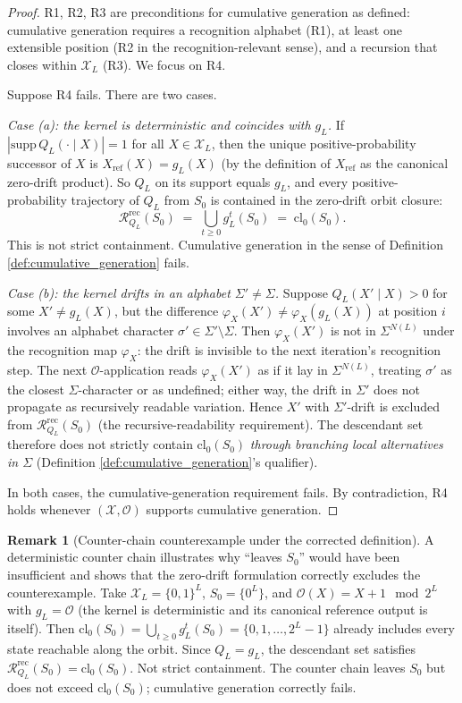 \documentclass[11pt]{article}
\theoremstyle{plain}
\theoremstyle{definition}
\newtheorem{remark}[theorem]{Remark}
\newcommand{\descX}{\varphi_X}
\newcommand{\Xset}{\mathcal{X}}
\newcommand{\Op}{\mathcal{O}}
\newcommand{\Reach}{\mathcal{R}}
\begin{document}
\begin{proof}
R1, R2, R3 are preconditions for cumulative generation as defined: cumulative generation requires a recognition alphabet (R1), at least one extensible position (R2 in the recognition-relevant sense), and a recursion that closes within $\Xset_L$ (R3). We focus on R4.

Suppose R4 fails. There are two cases.

\emph{Case (a): the kernel is deterministic and coincides with $g_L$.} If $|\mathrm{supp}\, Q_L(\cdot \mid X)| = 1$ for all $X \in \Xset_L$, then the unique positive-probability successor of $X$ is $X_{\mathrm{ref}}(X) = g_L(X)$ (by the definition of $X_{\mathrm{ref}}$ as the canonical zero-drift product). So $Q_L$ on its support equals $g_L$, and every positive-probability trajectory of $Q_L$ from $S_0$ is contained in the zero-drift orbit closure:
\[
\Reach_{Q_L}^{\mathrm{rec}}(S_0) \;=\; \bigcup_{t \ge 0} g_L^t(S_0) \;=\; \mathrm{cl}_0(S_0).
\]
This is not strict containment. Cumulative generation in the sense of Definition \ref{def:cumulative_generation} fails.

\emph{Case (b): the kernel drifts in an alphabet $\Sigma' \ne \Sigma$.} Suppose $Q_L(X' \mid X) > 0$ for some $X' \ne g_L(X)$, but the difference $\descX(X') \ne \descX(g_L(X))$ at position $i$ involves an alphabet character $\sigma' \in \Sigma' \setminus \Sigma$. Then $\descX(X')$ is not in $\Sigma^{N(L)}$ under the recognition map $\descX$: the drift is invisible to the next iteration's recognition step. The next $\Op$-application reads $\descX(X')$ as if it lay in $\Sigma^{N(L)}$, treating $\sigma'$ as the closest $\Sigma$-character or as undefined; either way, the drift in $\Sigma'$ does not propagate as recursively readable variation. Hence $X'$ with $\Sigma'$-drift is excluded from $\Reach_{Q_L}^{\mathrm{rec}}(S_0)$ (the recursive-readability requirement). The descendant set therefore does not strictly contain $\mathrm{cl}_0(S_0)$ \emph{through branching local alternatives in $\Sigma$} (Definition \ref{def:cumulative_generation}'s qualifier).

In both cases, the cumulative-generation requirement fails. By contradiction, R4 holds whenever $(\Xset, \Op)$ supports cumulative generation.
\end{proof}

\begin{remark}[Counter-chain counterexample under the corrected definition]
\label{rem:det_closure_essential}
A deterministic counter chain illustrates why ``leaves $S_0$'' would have been insufficient and shows that the zero-drift formulation correctly excludes the counterexample. Take $\Xset_L = \{0, 1\}^L$, $S_0 = \{0^L\}$, and $\Op(X) = X + 1 \mod 2^L$ with $g_L = \Op$ (the kernel is deterministic and its canonical reference output is itself). Then $\mathrm{cl}_0(S_0) = \bigcup_{t \ge 0} g_L^t(S_0) = \{0, 1, \ldots, 2^L - 1\}$ already includes every state reachable along the orbit. Since $Q_L = g_L$, the descendant set satisfies $\Reach_{Q_L}^{\mathrm{rec}}(S_0) = \mathrm{cl}_0(S_0)$. Not strict containment. The counter chain leaves $S_0$ but does not exceed $\mathrm{cl}_0(S_0)$; cumulative generation correctly fails.
\end{remark}
\end{document}

